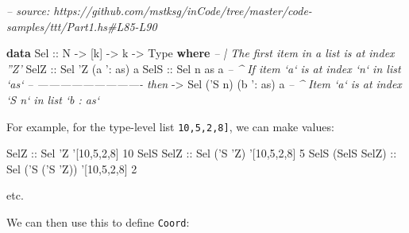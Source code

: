 \documentclass[]{article}
\newenvironment{Shaded}{}{}
\newcommand{\CommentTok}[1]{\textcolor[rgb]{0.38,0.63,0.69}{\textit{#1}}}
\newcommand{\DataTypeTok}[1]{\textcolor[rgb]{0.56,0.13,0.00}{#1}}
\newcommand{\DecValTok}[1]{\textcolor[rgb]{0.25,0.63,0.44}{#1}}
\newcommand{\FunctionTok}[1]{\textcolor[rgb]{0.02,0.16,0.49}{#1}}
\newcommand{\KeywordTok}[1]{\textcolor[rgb]{0.00,0.44,0.13}{\textbf{#1}}}
\newcommand{\NormalTok}[1]{#1}
\newcommand{\OtherTok}[1]{\textcolor[rgb]{0.00,0.44,0.13}{#1}}
\begin{document}
\begin{Shaded}
\begin{Highlighting}[]
\CommentTok{-- source: https://github.com/mstksg/inCode/tree/master/code-samples/ttt/Part1.hs#L85-L90}

\KeywordTok{data} \DataTypeTok{Sel}\OtherTok{ ::} \DataTypeTok{N} \OtherTok{->}\NormalTok{ [k] }\OtherTok{->}\NormalTok{ k }\OtherTok{->} \DataTypeTok{Type} \KeywordTok{where}
    \CommentTok{-- | The first item in a list is at index ''Z'}
    \DataTypeTok{SelZ}\OtherTok{ ::} \DataTypeTok{Sel}\NormalTok{ '}\DataTypeTok{Z}\NormalTok{ (a '}\FunctionTok{:}\NormalTok{ as) a}
    \DataTypeTok{SelS}\OtherTok{ ::} \DataTypeTok{Sel}\NormalTok{     n        as  a  }\CommentTok{-- ^ If item `a` is at index `n` in list `as`}
         \CommentTok{-- ---------------------------- then}
         \OtherTok{->} \DataTypeTok{Sel}\NormalTok{ ('}\DataTypeTok{S}\NormalTok{ n) (b '}\FunctionTok{:}\NormalTok{ as) a  }\CommentTok{-- ^ Item `a` is at index `S n` in list `b : as`}
\end{Highlighting}
\end{Shaded}

For example, for the type-level list \texttt{\textquotesingle{}{[}10,5,2,8{]}},
we can make values:

\begin{Shaded}
\begin{Highlighting}[]
\DataTypeTok{SelZ}\OtherTok{             ::} \DataTypeTok{Sel}\NormalTok{         '}\DataTypeTok{Z}\NormalTok{   '[}\DecValTok{10}\NormalTok{,}\DecValTok{5}\NormalTok{,}\DecValTok{2}\NormalTok{,}\DecValTok{8}\NormalTok{] }\DecValTok{10}
\DataTypeTok{SelS} \DataTypeTok{SelZ}\OtherTok{        ::} \DataTypeTok{Sel}\NormalTok{     ('}\DataTypeTok{S}\NormalTok{ '}\DataTypeTok{Z}\NormalTok{)  '[}\DecValTok{10}\NormalTok{,}\DecValTok{5}\NormalTok{,}\DecValTok{2}\NormalTok{,}\DecValTok{8}\NormalTok{] }\DecValTok{5}
\DataTypeTok{SelS}\NormalTok{ (}\DataTypeTok{SelS} \DataTypeTok{SelZ}\NormalTok{)}\OtherTok{ ::} \DataTypeTok{Sel}\NormalTok{ ('}\DataTypeTok{S}\NormalTok{ ('}\DataTypeTok{S}\NormalTok{ '}\DataTypeTok{Z}\NormalTok{)) '[}\DecValTok{10}\NormalTok{,}\DecValTok{5}\NormalTok{,}\DecValTok{2}\NormalTok{,}\DecValTok{8}\NormalTok{] }\DecValTok{2}
\end{Highlighting}
\end{Shaded}

etc.

We can then use this to define \texttt{Coord}:
\end{document}
